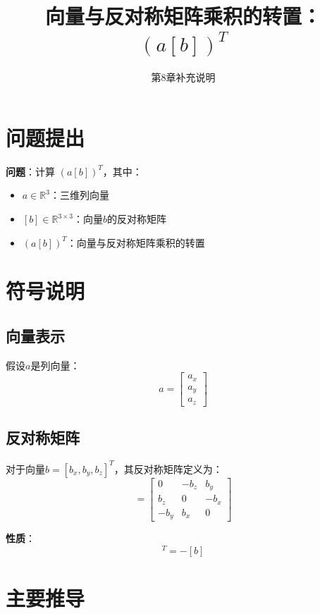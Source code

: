 \documentclass[12pt,a4paper]{article}
\title{向量与反对称矩阵乘积的转置：$(a[b])^T$}
\author{第8章补充说明}
\date{}
\begin{document}
\maketitle

\section{问题提出}

\textbf{问题}：计算 $(a[b])^T$，其中：
\begin{itemize}
\item $a \in \mathbb{R}^3$：三维列向量
\item $[b] \in \mathbb{R}^{3 \times 3}$：向量$b$的反对称矩阵
\item $(a[b])^T$：向量与反对称矩阵乘积的转置
\end{itemize}

\section{符号说明}

\subsection{向量表示}

假设$a$是列向量：
\begin{equation}
a = \begin{bmatrix} a_x \\ a_y \\ a_z \end{bmatrix}
\end{equation}

\subsection{反对称矩阵}

对于向量$b = [b_x, b_y, b_z]^T$，其反对称矩阵定义为：
\begin{equation}
[b] = \begin{bmatrix}
0 & -b_z & b_y \\
b_z & 0 & -b_x \\
-b_y & b_x & 0
\end{bmatrix}
\end{equation}

\textbf{性质}：
\begin{equation}
[b]^T = -[b]
\end{equation}

\section{主要推导}
\end{document}
